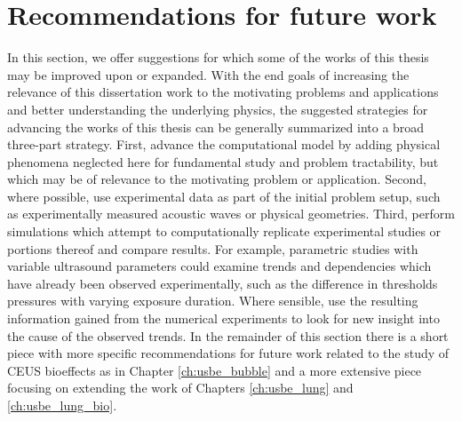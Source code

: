 \section{Recommendations for future work}
In this section, we offer suggestions for which some of the works of
this thesis may be improved upon or expanded. With the end goals of
increasing the relevance of this dissertation work to the motivating
problems and applications and better understanding the underlying
physics, the suggested strategies for advancing the works of this
thesis can be generally summarized into a broad three-part
strategy. First, advance the computational model by adding physical
phenomena neglected here for fundamental study and problem
tractability, but which may be of relevance to the motivating problem
or application. Second, where possible, use experimental data as part
of the initial problem setup, such as experimentally measured acoustic
waves or physical geometries. Third, perform simulations which attempt
to computationally replicate experimental studies or portions thereof
and compare results. For example, parametric studies with variable
ultrasound parameters could examine trends and dependencies which
have already been observed experimentally, such as the difference in
thresholds pressures with varying exposure duration. Where sensible,
use the resulting information gained from the numerical experiments to
look for new insight into the cause of the observed trends. In the
remainder of this section there is a short piece with more specific
recommendations for future work related to the study of \ac{CEUS}
bioeffects as in Chapter \ref{ch:usbe_bubble} and a more extensive
piece focusing on extending the work of Chapters \ref{ch:usbe_lung}
and \ref{ch:usbe_lung_bio}.

